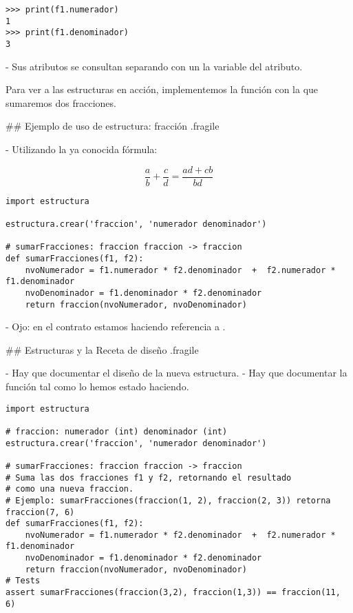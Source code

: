 \begin{lstlisting}
>>> print(f1.numerador)
1
>>> print(f1.denominador)
3
\end{lstlisting}

- Sus atributos se consultan separando con un  la variable del atributo.

\vfill

\bgnblockidea
Para ver a las estructuras en acción, implementemos la función con la que sumaremos dos fracciones.
\trmblockidea

## Ejemplo de uso de estructura: fracción {.fragile}


- Utilizando la ya conocida fórmula:

$$ \frac{a}{b} + \frac{c}{d} = \frac{ad + cb}{bd}$$

\vfill

\begin{lstlisting}[style=frame03]
import estructura

estructura.crear('fraccion', 'numerador denominador')

# sumarFracciones: fraccion fraccion -> fraccion
def sumarFracciones(f1, f2):
    nvoNumerador = f1.numerador * f2.denominador  +  f2.numerador * f1.denominador
    nvoDenominador = f1.denominador * f2.denominador
    return fraccion(nvoNumerador, nvoDenominador)
\end{lstlisting}

- Ojo: en el contrato estamos haciendo referencia a .

## Estructuras y la Receta de diseño {.fragile}

- Hay que documentar el diseño de la nueva estructura.
- Hay que documentar la función tal como lo hemos estado haciendo.

\begin{lstlisting}[style=frame03]
import estructura

# fraccion: numerador (int) denominador (int)
estructura.crear('fraccion', 'numerador denominador')

# sumarFracciones: fraccion fraccion -> fraccion
# Suma las dos fracciones f1 y f2, retornando el resultado
# como una nueva fraccion.
# Ejemplo: sumarFracciones(fraccion(1, 2), fraccion(2, 3)) retorna fraccion(7, 6)
def sumarFracciones(f1, f2):
    nvoNumerador = f1.numerador * f2.denominador  +  f2.numerador * f1.denominador
    nvoDenominador = f1.denominador * f2.denominador
    return fraccion(nvoNumerador, nvoDenominador)
# Tests
assert sumarFracciones(fraccion(3,2), fraccion(1,3)) == fraccion(11, 6)
\end{lstlisting}

